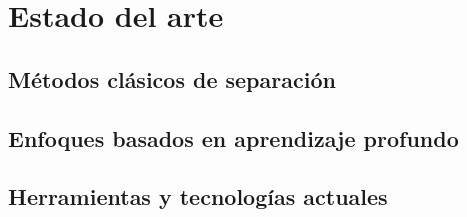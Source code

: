 \documentclass[a4paper,11pt]{memoir}
\begin{document}
%
%
%

\chapter{Estado del arte}

%
%
\section{Métodos clásicos de separación}

\section{Enfoques basados en aprendizaje profundo}

\section{Herramientas y tecnologías actuales}

%
\end{document}
